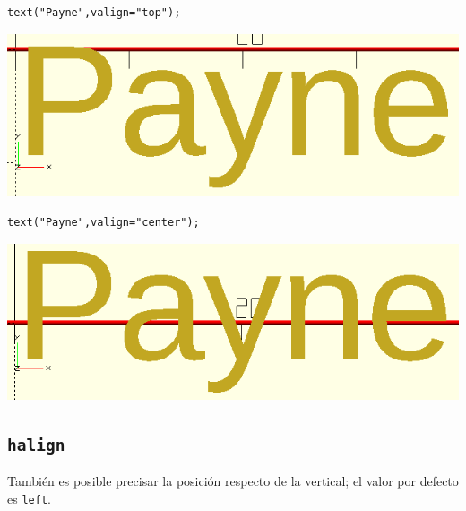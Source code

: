 \begin{center}
\begin{minipage}[]{.65\textwidth}%
 \begin{lstlisting}[numbers=none]
text("Payne",valign="top");
\end{lstlisting}%
\end{minipage}\hfill
\begin{minipage}[]{.35\textwidth}%
  \centering
  \includegraphics[width=.7\textwidth]{imagenes/payne-top}
\end{minipage}
\end{center}

\begin{center}
\begin{minipage}[]{.65\textwidth}%
 \begin{lstlisting}[numbers=none]
text("Payne",valign="center");
\end{lstlisting}%
\end{minipage}\hfill
\begin{minipage}[]{.35\textwidth}%
  \centering
  \includegraphics[width=.7\textwidth]{imagenes/payne-center-v}
\end{minipage}
\end{center}


\subsection{\texttt{halign}}

\guillemotright También es posible precisar la posición respecto de la
vertical; el valor por defecto es \lstinline!left!.


